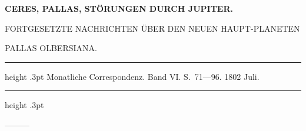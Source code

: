 \clearpage
\endgroup
\begingroup
\pagestyle{empty}
\newcommand{\GaussVIGathering}[2]{%
  \fancypagestyle{gaussVIGathering}{%
    \fancyhf{}%
    \renewcommand{\headrulewidth}{0pt}%
    \renewcommand{\footrulewidth}{0pt}%
    \fancyfoot[C]{\makebox[\textwidth][l]{%
      \hspace*{.025\textwidth}{\footnotesize\bfseries #1}\hfill
      {\normalsize\bfseries\textls[90]{#2}}\hspace*{.18\textwidth}}}%
  }%
  \thispagestyle{gaussVIGathering}%
}
\thispagestyle{empty}
\noindent{}%
\makebox[12mm][l]{}%
\parbox[t]{\dimexpr\linewidth-24mm\relax}{\centering\footnotesize\bfseries CERES, PALLAS, STÖRUNGEN DURCH JUPITER.\par}%
\par\nobreak\medskip
{}
\begin{center}
{\small FORTGESETZTE NACHRICHTEN ÜBER DEN NEUEN HAUPT-PLANETEN\par
PALLAS OLBERSIANA.\par}
\end{center}
\begin{center}
\parbox{.75\linewidth}{%
  \centering\fontsize{8.2}{10.2}\selectfont
  \hrule height .3pt\relax\vspace{2.5pt}
  Monatliche Correspondenz. Band VI. S.\ 71—96. 1802 Juli.\par
  \vspace{2.5pt}\hrule height .3pt\relax
}
\end{center}
\par\indent —\quad —\quad —\par
